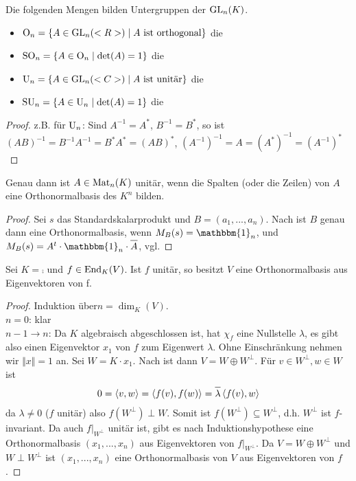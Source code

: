 \begin{proposition}
	Die folgenden Mengen bilden Untergruppen der $\operatorname{GL}_n(K)$.
	\begin{itemize}
		\item $\operatorname{O}_n=\{A\in\operatorname{GL}_n(<R>)\mid A\text{ ist orthogonal}\}$ die 
		\item $\operatorname{SO}_n=\{A\in \operatorname{O}_n\mid \det(A)=1\}$ die 
		\item $\operatorname{U}_n=\{A\in\operatorname{GL}_n(<C>)\mid A\text{ ist unitär}\}$ die 
		\item $\operatorname{SU}_n=\{A\in \operatorname{U}_n\mid \det(A)=1\}$ die 
	\end{itemize}
\end{proposition}
\begin{proof}
	z.B. für $\operatorname{U}_n$: Sind $A^{-1}=A^*$, $B^{-1}=B^*$, so ist $(AB)^{-1}=B^{-1}A^{-1}=B^*A^*=(AB)^*$, $(A^{-1})^{-1}=A=(A^*)^{-1}=(A^{-1})^*$
\end{proof}

\begin{proposition}
	Genau dann ist $A\in\operatorname{Mat}_n(K)$ unitär, wenn die Spalten (oder die Zeilen) von $A$ eine Orthonormalbasis des $K^n$ bilden. 
\end{proposition}
\begin{proof}
	Sei $s$ das Standardskalarprodukt und $B=(a_1,...,a_n)$. Nach  ist $B$ genau dann eine Orthonormalbasis, wenn $M_B(s)=\mathbbm{1}_n$, und $M_B(s)=A^t\cdot\mathbbm{1}_n\cdot\overline{A}$, vgl. 
\end{proof}

\begin{theorem}
	Sei $K=\comp$ und $f\in\operatorname{End}_K(V)$. Ist $f$ unitär, so besitzt $V$ eine Orthonormalbasis aus Eigenvektoren von f.
\end{theorem}
\begin{proof}
	Induktion über$n=\dim_K(V)$. \\
	\emph{$n=0$}: klar \\
	\emph{$n-1\to n$}: Da $K$ algebraisch abgeschlossen ist, hat $\chi_f$ eine Nullstelle $\lambda$, es gibt also einen Eigenvektor $x_1$ von $f$ zum Eigenwert $\lambda$. Ohne Einschränkung nehmen wir $\Vert x\Vert=1$ an. Sei $W=K\cdot x_1$. Nach  ist dann $V=W\oplus W^\perp$. Für $v\in W^\perp, w\in W$ ist
	\begin{align}
		0=\skalar{v}{w}=\skalar{f(v)}{f(w)}=\overline{\lambda}\skalar{f(v)}{w}\notag
	\end{align}
	da $\lambda\neq 0$ ($f$ unitär) also $f(W^\perp)\perp W$. Somit ist $f(W^\perp)\subseteq W^\perp$, d.h. $W^\perp$ ist $f$-invariant. Da auch $f\vert_{W^\perp}$ unitär ist, gibt es nach Induktionshypothese eine Orthonormalbasis $(x_1,...,x_n)$ aus Eigenvektoren von $f\vert_{W^\perp}$. Da $V=W\oplus W^\perp$ und $W\perp W^\perp$ ist $(x_1,...,x_n)$ eine Orthonormalbasis von $V$ aus Eigenvektoren von $f$.
\end{proof}

